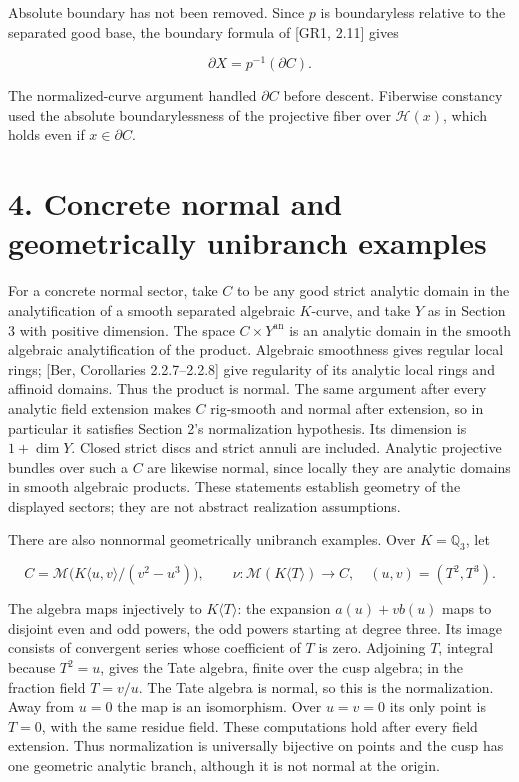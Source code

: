 \documentclass[11pt,a4paper]{article}
\begin{document}
Absolute boundary has not been removed. Since \(p\) is boundaryless relative to the separated good base, the boundary formula of [GR1, 2.11] gives

\[
\partial X=p^{-1}(\partial C).
\]

The normalized-curve argument handled \(\partial C\) before descent. Fiberwise constancy used the absolute boundarylessness of the projective fiber over \(\mathcal H(x)\), which holds even if \(x\in\partial C\).

\section*{4. Concrete normal and geometrically unibranch examples}

For a concrete normal sector, take \(C\) to be any good strict analytic domain in the analytification of a smooth separated algebraic \(K\)-curve, and take \(Y\) as in Section 3 with positive dimension. The space \(C\times Y^{\mathrm{an}}\) is an analytic domain in the smooth algebraic analytification of the product. Algebraic smoothness gives regular local rings; [Ber, Corollaries 2.2.7--2.2.8] give regularity of its analytic local rings and affinoid domains. Thus the product is normal. The same argument after every analytic field extension makes \(C\) rig-smooth and normal after extension, so in particular it satisfies Section 2's normalization hypothesis. Its dimension is \(1+\dim Y\). Closed strict discs and strict annuli are included. Analytic projective bundles over such a \(C\) are likewise normal, since locally they are analytic domains in smooth algebraic products. These statements establish geometry of the displayed sectors; they are not abstract realization assumptions.

There are also nonnormal geometrically unibranch examples. Over \(K=\mathbb Q_3\), let

\[
C=\mathcal M\bigl(K\langle u,v\rangle/(v^2-u^3)\bigr),
\qquad \nu:\mathcal M(K\langle T\rangle)\to C,
\quad (u,v)=(T^2,T^3).
\]

The algebra maps injectively to \(K\langle T\rangle\): the expansion \(a(u)+v b(u)\) maps to disjoint even and odd powers, the odd powers starting at degree three. Its image consists of convergent series whose coefficient of \(T\) is zero. Adjoining \(T\), integral because \(T^2=u\), gives the Tate algebra, finite over the cusp algebra; in the fraction field \(T=v/u\). The Tate algebra is normal, so this is the normalization. Away from \(u=0\) the map is an isomorphism. Over \(u=v=0\) its only point is \(T=0\), with the same residue field. These computations hold after every field extension. Thus normalization is universally bijective on points and the cusp has one geometric analytic branch, although it is not normal at the origin.
\end{document}
